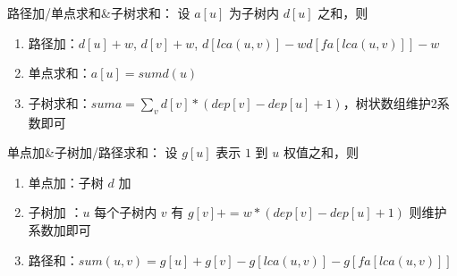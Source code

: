 路径加/单点求和\&子树求和： 设 $a[u]$ 为子树内 $d[u]$ 之和，则

\begin{enumerate}
    \item 路径加：$d[u]+w$, $d[v]+w$, $d[lca(u,v)]-w d[fa[lca(u,v)]]-w$
    \item 单点求和：$a[u]=sumd(u)$
    \item 子树求和：$suma=\sum_v d[v]*(dep[v]-dep[u]+1)$，树状数组维护2系数即可
\end{enumerate}


单点加\&子树加/路径求和： 设 $g[u]$ 表示 $1$ 到 $u$ 权值之和，则

\begin{enumerate}
    \item 单点加：子树 $d$ 加
    \item 子树加 ：$u$ 每个子树内 $v$ 有 $g[v] += w*(dep[v]-dep[u]+1)$ 则维护系数加即可
    \item 路径和：$sum(u,v)=g[u]+g[v]-g[lca(u,v)]-g[fa[lca(u,v)]]$
\end{enumerate}